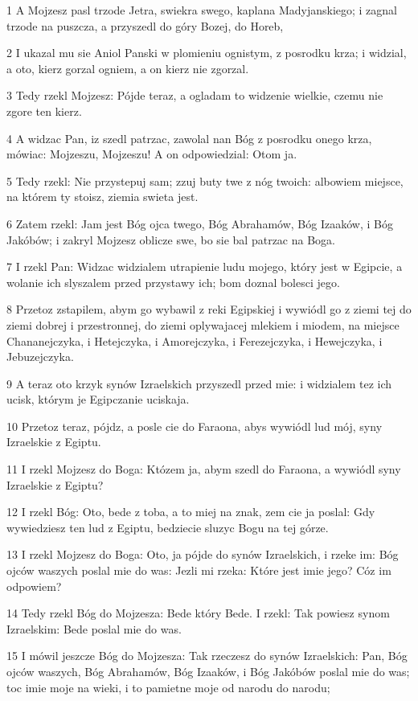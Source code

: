 \par 1 A Mojzesz pasl trzode Jetra, swiekra swego, kaplana Madyjanskiego; i zagnal trzode na puszcza, a przyszedl do góry Bozej, do Horeb,
\par 2 I ukazal mu sie Aniol Panski w plomieniu ognistym, z posrodku krza; i widzial, a oto, kierz gorzal ogniem, a on kierz nie zgorzal.
\par 3 Tedy rzekl Mojzesz: Pójde teraz, a ogladam to widzenie wielkie, czemu nie zgore ten kierz.
\par 4 A widzac Pan, iz szedl patrzac, zawolal nan Bóg z posrodku onego krza, mówiac: Mojzeszu, Mojzeszu! A on odpowiedzial: Otom ja.
\par 5 Tedy rzekl: Nie przystepuj sam; zzuj buty twe z nóg twoich: albowiem miejsce, na którem ty stoisz, ziemia swieta jest.
\par 6 Zatem rzekl: Jam jest Bóg ojca twego, Bóg Abrahamów, Bóg Izaaków, i Bóg Jakóbów; i zakryl Mojzesz oblicze swe, bo sie bal patrzac na Boga.
\par 7 I rzekl Pan: Widzac widzialem utrapienie ludu mojego, który jest w Egipcie, a wolanie ich slyszalem przed przystawy ich; bom doznal bolesci jego.
\par 8 Przetoz zstapilem, abym go wybawil z reki Egipskiej i wywiódl go z ziemi tej do ziemi dobrej i przestronnej, do ziemi oplywajacej mlekiem i miodem, na miejsce Chananejczyka, i Hetejczyka, i Amorejczyka, i Ferezejczyka, i Hewejczyka, i Jebuzejczyka.
\par 9 A teraz oto krzyk synów Izraelskich przyszedl przed mie: i widzialem tez ich ucisk, którym je Egipczanie uciskaja.
\par 10 Przetoz teraz, pójdz, a posle cie do Faraona, abys wywiódl lud mój, syny Izraelskie z Egiptu.
\par 11 I rzekl Mojzesz do Boga: Któzem ja, abym szedl do Faraona, a wywiódl syny Izraelskie z Egiptu?
\par 12 I rzekl Bóg: Oto, bede z toba, a to miej na znak, zem cie ja poslal: Gdy wywiedziesz ten lud z Egiptu, bedziecie sluzyc Bogu na tej górze.
\par 13 I rzekl Mojzesz do Boga: Oto, ja pójde do synów Izraelskich, i rzeke im: Bóg ojców waszych poslal mie do was: Jezli mi rzeka: Które jest imie jego? Cóz im odpowiem?
\par 14 Tedy rzekl Bóg do Mojzesza: Bede który Bede. I rzekl: Tak powiesz synom Izraelskim: Bede poslal mie do was.
\par 15 I mówil jeszcze Bóg do Mojzesza: Tak rzeczesz do synów Izraelskich: Pan, Bóg ojców waszych, Bóg Abrahamów, Bóg Izaaków, i Bóg Jakóbów poslal mie do was; toc imie moje na wieki, i to pamietne moje od narodu do narodu;
